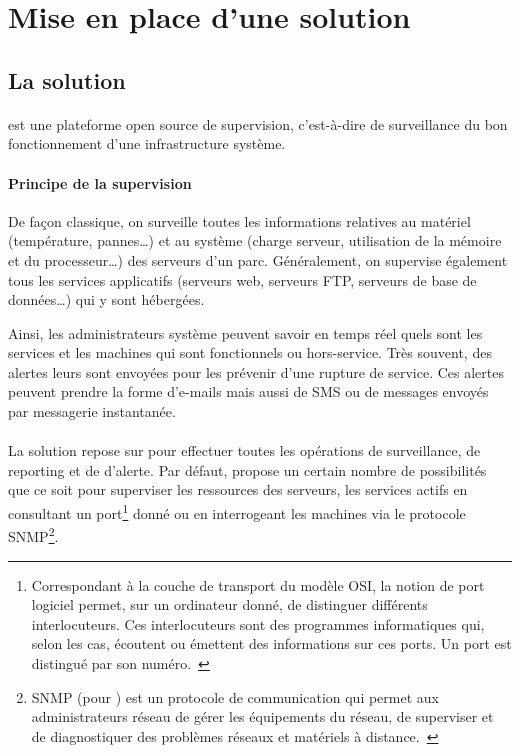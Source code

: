 \section{Mise en place d'une solution \acentreon{}}
\label{section:centreon}

\subsection{La solution \acentreon}

\paragraph{}
\acentreon{} est une plateforme open source de supervision, c'est-à-dire de surveillance du bon fonctionnement d'une infrastructure système.

\paragraph{Principe de la supervision}
De façon classique, on surveille toutes les informations relatives au matériel (température, pannes\ldots) et au système (charge serveur, utilisation de la mémoire et du processeur\ldots) des serveurs d'un parc.
Généralement, on supervise également tous les services applicatifs (serveurs web, serveurs FTP, serveurs de base de données\ldots) qui y sont hébergées.

Ainsi, les administrateurs système peuvent savoir en temps réel quels sont les services et les machines qui sont fonctionnels ou hors-service.
Très souvent, des alertes leurs sont envoyées pour les prévenir d'une rupture de service.
Ces alertes peuvent prendre la forme d'e-mails mais aussi de SMS ou de messages envoyés par messagerie instantanée.

\paragraph{\anagios}
La solution \acentreon{} repose sur \anagios{} pour effectuer toutes les opérations de surveillance, de reporting et de d'alerte.
Par défaut, \anagios{} propose un certain nombre de possibilités que ce soit pour superviser les ressources des serveurs, les services actifs en consultant un port\footnote{Correspondant à la couche de transport du modèle OSI, la notion de port logiciel permet, sur un ordinateur donné, de distinguer différents interlocuteurs. Ces interlocuteurs sont des programmes informatiques qui, selon les cas, écoutent ou émettent des informations sur ces ports. Un port est distingué par son numéro.~\cite{port}} donné ou en interrogeant les machines via le protocole SNMP\footnote{SNMP (pour ) est un protocole de communication qui permet aux administrateurs réseau de gérer les équipements du réseau, de superviser et de diagnostiquer des problèmes réseaux et matériels à distance.~\cite{snmp}}.

